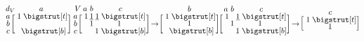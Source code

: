 \documentclass[sn-mathphys]{sn-jnl}
\begin{document}
$$
	\def\rowsp{0.4em}
	\def\arraystretch{0.60}
	\makeatletter\setlength\BA@colsep{0.9pt}\makeatother
	\begin{blockarray}{cc}{d_V}
	\kern-0.2em & a \\
		\begin{block}{c[c]}
  		a \kern \rowsp & \; 1 \; \topstrut \\
  		b \kern \rowsp & \;  \; \\
  		c \kern \rowsp & \;  \; \botstrut \\
		\end{block}
	\end{blockarray}
	\; \;
	\begin{blockarray}{cccc}{V}
	 \kern-0.2em & a & b & c  \\
		\begin{block}{c[ccc]}
  		a \kern \rowsp & \; 1 & \underline{1} & \underline{1} \; \topstrut \\
  		b \kern \rowsp & \;  & 1 & 1 \; \\
  		c \kern \rowsp & \;  &  & 1 \; \botstrut \\
		\end{block}
	\end{blockarray}
\; \to
\begin{blockarray}{cc}{}
	\kern-0.2em & b \\
		\begin{block}{c[c]}
  		  & \; 1 \; \topstrut \\
  		 & \;  1 \; \\
  		 & \; \; \botstrut \\
		\end{block}
	\end{blockarray}
	\; \;
\begin{blockarray}{cccc}{}
	\kern-0.2em & a & b & c  \\
		\begin{block}{c[ccc]}
  		  & \; 1 &    & \underline{1} \; \topstrut \\
  		  & \;    & 1 &  1 \; \\
  		 & \;  & &  1 \; \botstrut \\
		\end{block}
	\end{blockarray}
\; \to
	\begin{blockarray}{cc}{}
	\kern-0.2em & c \\
		\begin{block}{c[c]}
  		  & \; 1 \; \topstrut \\
  		 & \; 1 \; \\

\end{block}
\end{blockarray}$$
\end{document}
